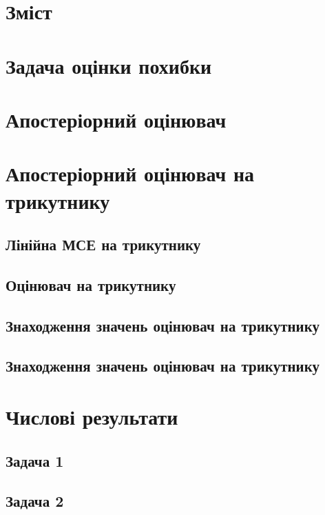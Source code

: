 \documentclass[a4paper,oneside]{article}
\begin{document}
	\pagestyle{empty} %

	

	\linespread{1.5}
	\selectfont
	\addtocounter{page}{1}

	\section*{Зміст}

	\makeatletter
	\makeatother

	\newpage
	\pagestyle{plain}

	
	
	
	\section{Задача оцінки похибки}
	\section{Апостеріорний оцінювач}
	\section{Апостеріорний оцінювач на трикутнику}
		\subsection{Лінійна МСЕ на трикутнику}
		\subsection{Оцінювач на трикутнику}
		\subsection{Знаходження значень оцінювач на трикутнику}
		\subsection{Знаходження значень оцінювач на трикутнику}
	\section{Числові результати}
		\subsection{Задача 1}
		\subsection{Задача 2}
\end{document}
